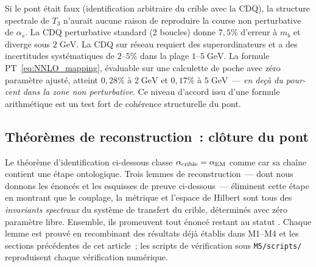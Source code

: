 \documentclass[12pt,a4paper]{article}
\begin{document}
\begin{remarque}
\label{rem:running_bridge}
Si le pont était faux (identification arbitraire du crible avec la
CDQ), la structure spectrale de $T_3$ n'aurait aucune raison de
reproduire la course non perturbative de $\alpha_s$. La CDQ
perturbative standard (2 boucles) donne $7{,}5\%$ d'erreur à $m_b$
et diverge sous $2\;\mathrm{GeV}$. La CDQ sur réseau requiert des
superordinateurs et a des incertitudes systématiques de
$2\text{--}5\%$ dans la plage $1\text{--}5\;\mathrm{GeV}$. La
formule PT~\eqref{eq:NNLO_mapping}, évaluable sur une calculette
de poche avec zéro paramètre ajusté, atteint $0{,}28\%$ à
$2\;\mathrm{GeV}$ et $0{,}17\%$ à $5\;\mathrm{GeV}$~--- \emph{en
deçà du pour-cent dans la zone non perturbative}. Ce niveau d'accord
issu d'une formule arithmétique est un test fort de cohérence
structurelle du pont.
\end{remarque}

\subsection{Théorèmes de reconstruction~: clôture du pont}
\label{sec:ch9_reconstruction_lemmas}

Le théorème d'identification ci-dessous classe
$\alpha_{\rm crible} = \alpha_{\mathrm{EM}}$ comme \BRIDGETAG{} car sa chaîne
contient une étape ontologique. Trois lemmes de reconstruction~---
dont nous donnons les énoncés et les esquisses de preuve
ci-dessous~--- éliminent cette étape en montrant que le couplage,
la métrique et l'espace de Hilbert sont tous des \emph{invariants
spectraux} du système de transfert du crible, déterminés avec zéro
paramètre libre. Ensemble, ils promeuvent tout énoncé \BRIDGETAG{}
restant au statut \THMTAG. Chaque lemme est prouvé en recombinant
des résultats déjà établis dans M1--M4 et les sections précédentes
de cet article~; les scripts de vérification sous
\texttt{M5/scripts/} reproduisent chaque vérification numérique.
\end{document}

